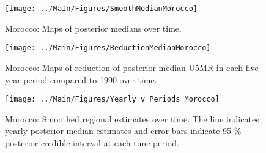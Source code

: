\documentclass[12pt]{article}\usepackage[]{graphicx}\usepackage[]{color}
\newenvironment{knitrout}{}{} %
\begin{document}
\begin{knitrout}
\color{fgcolor}\begin{figure}[bht]

{\centering \texttt{[image: ../Main/Figures/SmoothMedianMorocco]} 

}

\caption[Morocco]{Morocco: Maps of posterior medians over time.}\label{fig:unnamed-chunk-224}
\end{figure}


\end{knitrout}
\begin{knitrout}
\color{fgcolor}\begin{figure}[bht]

{\centering \texttt{[image: ../Main/Figures/ReductionMedianMorocco]} 

}

\caption[Morocco]{Morocco: Maps of reduction of posterior median U5MR in each five-year period compared to 1990 over time.}\label{fig:unnamed-chunk-225}
\end{figure}


\end{knitrout}
\begin{knitrout}
\color{fgcolor}\begin{figure}[bht]

{\centering \texttt{[image: ../Main/Figures/Yearly\_v\_Periods\_Morocco]} 

}

\caption[Morocco]{Morocco: Smoothed regional estimates over time. The line indicates yearly posterior median estimates and error bars indicate 95 \% posterior credible interval at each time period.}\label{fig:unnamed-chunk-226}
\end{figure}


\end{knitrout}
\end{document}
